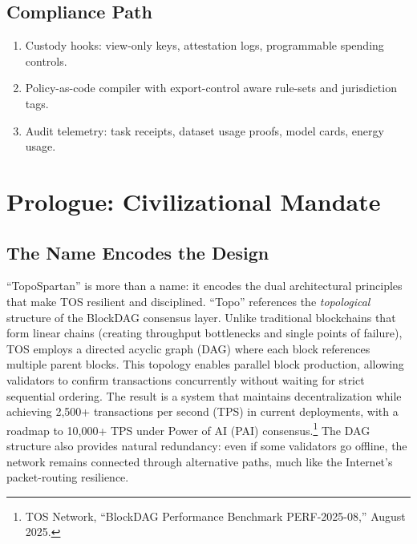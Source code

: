 \documentclass[11pt]{article}
\begin{document}
\subsection{Compliance Path}
\begin{enumerate}[noitemsep]
  \item Custody hooks: view-only keys, attestation logs, programmable spending controls.
  \item Policy-as-code compiler with export-control aware rule-sets and jurisdiction tags.
  \item Audit telemetry: task receipts, dataset usage proofs, model cards, energy usage.
\end{enumerate}

\section{Prologue: Civilizational Mandate}
\subsection{The Name Encodes the Design}
``TopoSpartan'' is more than a name: it encodes the dual architectural principles that make TOS resilient and disciplined. ``Topo'' references the \emph{topological} structure of the BlockDAG consensus layer. Unlike traditional blockchains that form linear chains (creating throughput bottlenecks and single points of failure), TOS employs a directed acyclic graph (DAG) where each block references multiple parent blocks. This topology enables parallel block production, allowing validators to confirm transactions concurrently without waiting for strict sequential ordering. The result is a system that maintains decentralization while achieving 2,500+ transactions per second (TPS) in current deployments, with a roadmap to 10,000+ TPS under Power of AI (PAI) consensus.\footnote{TOS Network, ``BlockDAG Performance Benchmark PERF-2025-08,'' August 2025.} The DAG structure also provides natural redundancy: even if some validators go offline, the network remains connected through alternative paths, much like the Internet's packet-routing resilience.
\end{document}
